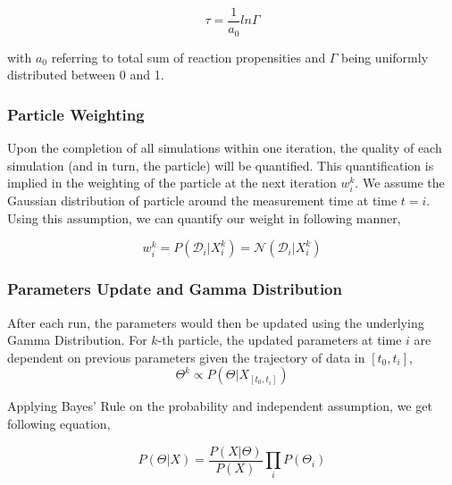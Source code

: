 \documentclass{bioinfo}
\begin{document}
\begin{equation}
\tau = \frac{1}{a_0} ln \Gamma\label{eq:15}
\end{equation}

with $a_0$ referring to total sum of reaction propensities and $\Gamma$ being uniformly distributed between 0 and 1. 

\subsubsection{Particle Weighting}

Upon the completion of all simulations within one iteration, the quality of each simulation (and in turn, the particle) will be quantified. This quantification is implied in the weighting of the particle at the next iteration $w_{i}^k$. We assume the Gaussian distribution of particle around the measurement time at time $t=i$. Using this assumption, we can quantify our weight in following manner,

\begin{equation}
w_i^k = P(\mathcal{D}_i | X_i^k) = \mathcal{N}(\mathcal{D}_i | X_i^k)\label{eq:16}
\end{equation}



\subsubsection{Parameters Update and Gamma Distribution}

After each run, the parameters would then be updated using the underlying Gamma Distribution. For $k$-th particle, the updated parameters at time $i$ are dependent on previous parameters given the trajectory of data in $[t_0, t_i]$,\\

\begin{equation}
\Theta^k \propto P(\Theta | X_{[t_0, t_i]})\label{eq:17}
\end{equation}

Applying Bayes' Rule on the probability and independent assumption, we get following equation,

\begin{equation}
P(\Theta | X) = \frac{P(X | \Theta)}{P (X)} \prod_{i} P(\Theta_i)\label{eq:18}
\end{equation}
\end{document}
